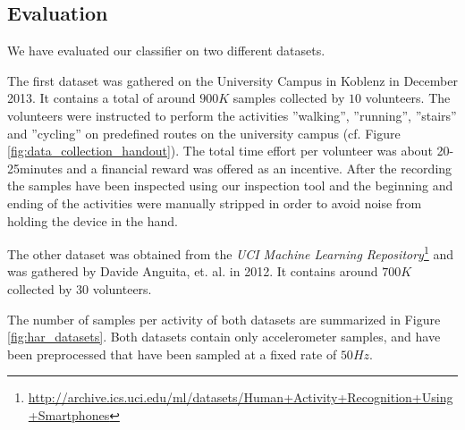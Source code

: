 

\subsection{Evaluation}\label{sec:har_eval}

We have evaluated our classifier on two different datasets.

The first dataset was gathered on the University Campus in Koblenz in
December 2013.  It contains a total of around $900K$ samples collected
by $10$ volunteers.  The volunteers were instructed to perform the
activities ''walking'', ''running'', ''stairs'' and ''cycling'' on
predefined routes on the university campus (cf. Figure
\ref{fig:data_collection_handout}). The total time effort per
volunteer was about 20-25minutes and a financial reward was offered as
an incentive. After the recording the samples have been inspected
using our inspection tool and the beginning and ending of the
activities were manually stripped in order to avoid noise from holding
the device in the hand.

%
%

The other dataset was obtained from the {\it UCI Machine Learning
  Repository}\footnote{\url{http://archive.ics.uci.edu/ml/datasets/Human+Activity+Recognition+Using+Smartphones}}
and was gathered by Davide Anguita, et. al. \cite{Anguita} in 2012.
It contains around $700K$ collected by 30 volunteers.

The number of samples per activity of both datasets are summarized in
Figure \ref{fig:har_datasets}. Both datasets contain only
accelerometer samples, and have been preprocessed that have been
sampled at a fixed rate of $50Hz$.

